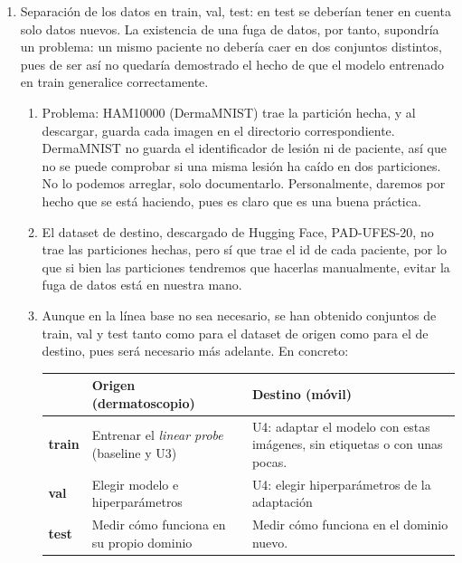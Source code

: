 \documentclass[10pt,a4paper]{article}
\renewcommand{\_}{\guionbajo\allowbreak}
\begin{document}
\begin{enumerate}
    \item Separación de los datos en train, val, test: en test se deberían tener en cuenta solo datos nuevos. 
    La existencia de una fuga de datos, por tanto, supondría un problema: un mismo paciente no debería caer en 
    dos conjuntos distintos, pues de ser así no quedaría demostrado el hecho de que el modelo entrenado en train 
    generalice correctamente. 

    \begin{enumerate}
        \item Problema: HAM10000 (DermaMNIST) trae la partición hecha, y al descargar, guarda cada imagen en el directorio 
        correspondiente. DermaMNIST no guarda el identificador de lesión ni de paciente, así que no se puede comprobar si una 
        misma lesión ha caído en dos particiones. No lo podemos arreglar, solo documentarlo. Personalmente, daremos por hecho 
        que se está haciendo, pues es claro que es una buena práctica. 

        \item El dataset de destino, descargado de Hugging Face, PAD-UFES-20, no trae las particiones hechas, pero sí que trae el 
        id de cada paciente, por lo que si bien las particiones tendremos que hacerlas manualmente, evitar la fuga de datos está en 
        nuestra mano. 

        \item Aunque en la línea base no sea necesario, se han obtenido conjuntos de train, val y test tanto como para el dataset
        de origen como para el de destino, pues será necesario más adelante. En concreto: 

        \begin{center}
            \captionsetup{type=table}
            \small
            \renewcommand{\arraystretch}{1.3}
            \begin{tabularx}{\linewidth}{@{}l>{\raggedright\arraybackslash}X>{\raggedright\arraybackslash}X@{}}
                \toprule
                & \textbf{Origen (dermatoscopio)} & \textbf{Destino (móvil)} \\
                \midrule
                \textbf{train} & Entrenar el \textit{linear probe} (baseline y U3)
                            & U4: adaptar el modelo con estas imágenes, sin etiquetas o con unas pocas. \\
                \textbf{val}   & Elegir modelo e hiperparámetros
                            & U4: elegir hiperparámetros de la adaptación \\
                \textbf{test}  & Medir cómo funciona en su propio dominio
                            & Medir cómo funciona en el dominio nuevo. \\
                \bottomrule
            \end{tabularx}
            \caption{Uso de cada partición en el origen y en el destino.}
            \label{tab:particiones}
        \end{center}
    \end{enumerate} 


\end{enumerate}
\end{document}
